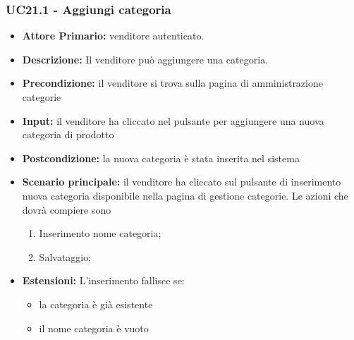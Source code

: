 \subsubsection{UC21.1 - Aggiungi categoria}
\label{UC21.1}
\begin{itemize}
    \item \textbf{Attore Primario:}  venditore autenticato.
    \item \textbf{Descrizione:}  Il venditore può aggiungere una categoria.
    \item \textbf{Precondizione:} il venditore si trova sulla pagina di amministrazione categorie
    \item \textbf{Input:} il venditore ha cliccato nel pulsante per aggiungere una nuova categoria di prodotto
    \item \textbf{Postcondizione:} la nuova categoria è stata inserita nel sistema
    \item \textbf{Scenario principale:} il venditore ha cliccato sul pulsante di inserimento nuova categoria disponibile nella pagina di gestione categorie.  Le azioni che dovrà compiere sono
    \begin{enumerate}
        \item Inserimento nome categoria;
        \item Salvataggio;
    \end{enumerate}
    \item \textbf{Estensioni:} L'inserimento fallisce se:
    \begin{itemize}
        \item la categoria è già esistente
        \item il nome categoria è vuoto
    \end{itemize}
\end{itemize}

